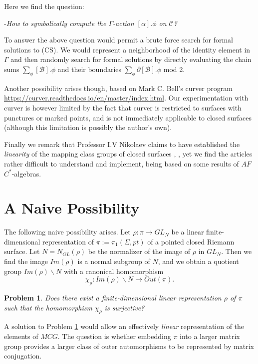 \documentclass[12pt]{amsart}
\newtheorem*{prob}{Problem}
\theoremstyle{definition}
\theoremstyle{remark}
\newcommand{\del}{\partial}
\newcommand{\sB}{\mathscr{B}}
\newcommand{\sC}{\mathscr{C}}
\begin{document}
Here we find the question: 

-\emph{How to symbolically compute the $\Gamma$-action $[\alpha] . \phi$ on $\sC$?} 

To answer the above question would permit a brute force search for formal solutions to (CS). We would represent a neighborhood of the identity element in $\Gamma$ and then randomly search for formal solutions by directly evaluating the chain sums $\sum_\phi [\sB].\phi$ and their boundaries $\sum_\phi \del[\sB].\phi$ mod 2.

Another possibility arises though, based on Mark C. Bell's curver program \url{https://curver.readthedocs.io/en/master/index.html}. Our experimentation with curver is however limited by the fact that curver is restricted to surfaces with punctures or marked points, and is not immediately applicable to closed surfaces (although this limitation is possibly the author's own).  

Finally we remark that Professor I.V Nikolaev claims to have established the \emph{linearity} of the mapping class groups of closed surfaces \cite{nikolaev2018mapping}, \cite{nikolaev2001toric}, yet we find the articles rather difficult to understand and implement, being based on some results of $AF$ $C^*$-algebras.


\section{A Naive Possibility}
The following naive possibility arises. Let $\rho:\pi \to GL_N$ be a linear finite-dimensional representation of $\pi:=\pi_1(\Sigma, pt)$ of a pointed closed Riemann surface. Let $N=N_{GL}(\rho)$ be the normalizer of the image of $\rho$ in $GL_N$. Then we find the image $Im(\rho)$ is a normal subgroup of $N$, and we obtain a quotient group $Im(\rho)\backslash N$ with a canonical homomorphism $$\chi_\rho: Im(\rho)\backslash N \to Out(\pi).$$

\begin{prob}
\label{fdrep}
Does there exist a finite-dimensional linear representation $\rho$ of $\pi$ such that the homomorphism $\chi_\rho$ is surjective?
\end{prob}

A solution to Problem \ref{fdrep} would allow an effectively \emph{linear} representation of the elements of $MCG$. The question is whether embedding $\pi$ into a larger matrix group provides a larger class of outer automorphisms to be represented by matrix conjugation.
\end{document}
